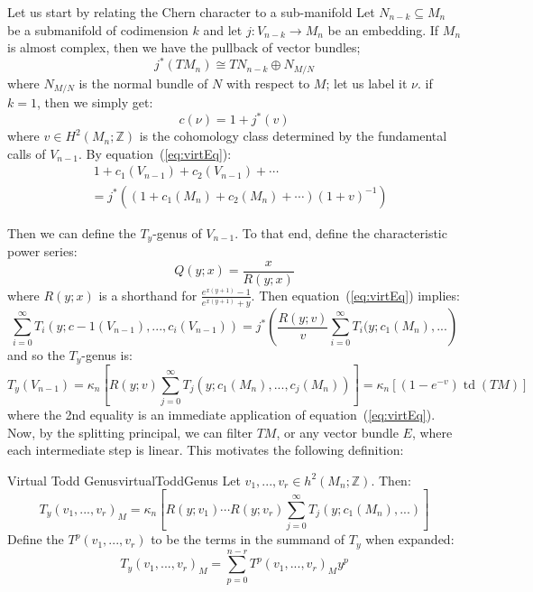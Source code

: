 \documentclass{book}
\newcommand{\Z}{{\mathbb{Z}}}
\newcommand{\td}{{\operatorname{td}}}
\newcommand{\sse}{\subseteq}
\begin{document}
Let us start by relating the Chern character to a sub-manifold Let $N_{n-k}\sse M_n$ be a submanifold of
codimension $k$  and let $j: V_{n-k} \to M_n$ be an embedding. If $M_n$ is almost complex, then we have the
pullback of vector bundles;
\begin{equation}\label{eq:virtEq}
  j^*(TM_n) \cong TN_{n-k} \oplus N_{M/N}
\end{equation}
where $N_{M/N}$ is the normal bundle of $N$ with respect to $M$; let us label it $\nu$. if $k = 1$, then we simply get:
\[
  c(\nu) = 1+ j^*(v)
\]
where $v \in H^2(M_n;\Z)$ is the cohomology class determined by the fundamental calls of $V_{n-1}$. By
equation~(\ref{eq:virtEq}):
\begin{align*}
  &\ 1 + c_1(V_{n-1}) + c_2(V_{n-1}) + \cdots \\
  &= j^*\left((1 + c_1(M_n) + c_2(M_n) + \cdots)(1+v)^{-1}\right)
\end{align*}

Then we can define the $T_y$-genus of $V_{n-1}$. To that end, define the characteristic power series:
\[
  Q(y;x) = \frac{x}{R(y;x)}
\]
where $R(y;x)$ is a shorthand for $\frac{e^{x(y+1)}-1}{e^{x(y+1)}+y}$. Then equation~(\ref{eq:virtEq})
implies:
\[
  \sum_{i=0}^\infty T_i(y; c-1(V_{n-1}), ..., c_i(V_{n-1})) = j^* \left( \frac{R(y;v)}{v}\sum_{i=0}^\infty
  T_i(y; c_1(M_n), ...\right)
\]
and so the $T_y$-genus is:
\[
  T_y(V_{n-1}) = \kappa_n \left[R(y;v) \sum_{j=0}^\infty T_j(y; c_1(M_n), ..., c_j(M_n))\right] = \kappa_n
  [(1-e^{-v}) \td(TM)]
\]
where the 2nd equality is an immediate application of equation~(\ref{eq:virtEq}). Now, by the splitting
principal, we can filter $TM$, or any vector bundle $E$, where each intermediate step is linear. This
motivates the following definition:

\begin{defn}{Virtual Todd Genus}{virtualToddGenus}
  Let $v_1, ..., v_r \in h^2(M_n; \Z)$. Then:
  \[
    T_y(v_1, ..., v_r)_M = \kappa_n \left[R(y; v_1)\cdots R(y; v_r) \sum_{j=0}^\infty T_j(y; c_1(M_n), ...)\right]
  \]
  Define the $T^p(v_1,..., v_r)$ to be the terms in the summand of $T_y$ when expanded:
  \[
    T_y(v_1, ..., v_r)_M = \sum_{p=0}^{n-r} T^p(v_1, ..., v_r)_My^p
  \]
\end{defn}
\end{document}
